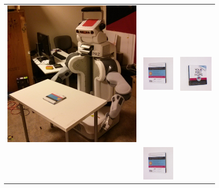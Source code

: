 \documentclass[conference]{IEEEtran}
\begin{document}

    \setlength{\tabcolsep}{0.1em}
    \begin{figure}[ht]
    \begin{tabular}{cccc}
    \multicolumn{2}{c}{\multirow{-5}{*}{\includegraphics[width=0.46\columnwidth]{pics/pr2_init.jpg}}} & \includegraphics[width=0.23\columnwidth]{pics/first_back.jpg} 
    &\includegraphics[width=0.23\columnwidth]{pics/first_cover1.jpg} \\
    \multicolumn{2}{c}{} & \includegraphics[width=0.23\columnwidth]{pics/first_back.jpg} 

\end{tabular}
\end{figure}
\end{document}
